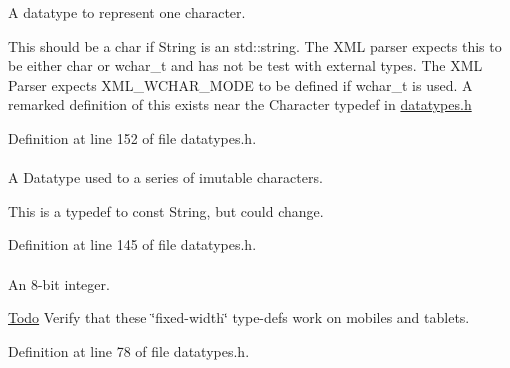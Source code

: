 A datatype to represent one character. 

This should be a char if String is an std::string. The XML parser expects this to be either char or wchar\_\-t and has not be test with external types. The XML Parser expects XML\_\-WCHAR\_\-MODE to be defined if wchar\_\-t is used. A remarked definition of this exists near the Character typedef in \hyperlink{datatypes_8h_source}{datatypes.h} 

Definition at line 152 of file datatypes.h.

\hypertarget{namespaceMezzanine_a63cd699ac54b73953f35ec9cfc05e506}{
\paragraph[{ConstString}]{}\hfill}
\label{namespaceMezzanine_a63cd699ac54b73953f35ec9cfc05e506}


A Datatype used to a series of imutable characters. 

This is a typedef to const String, but could change. 

Definition at line 145 of file datatypes.h.

\hypertarget{namespaceMezzanine_acbb048ee99aa07566d5a6eb33f5a2c2d}{
\paragraph[{Int8}]{}\hfill}
\label{namespaceMezzanine_acbb048ee99aa07566d5a6eb33f5a2c2d}


An 8-\/bit integer. 

\begin{Desc}
\item[\hyperlink{todo__todo000012}{Todo}]Verify that these \char`\"{}fixed-\/width\char`\"{} type-\/defs work on mobiles and tablets.\end{Desc}


Definition at line 78 of file datatypes.h.

\hypertarget{namespaceMezzanine_ac3576e52af3c62d13dde94829e0c5465}{
\paragraph[{Integer}]{}\hfill}
\label{namespaceMezzanine_ac3576e52af3c62d13dde94829e0c5465}


